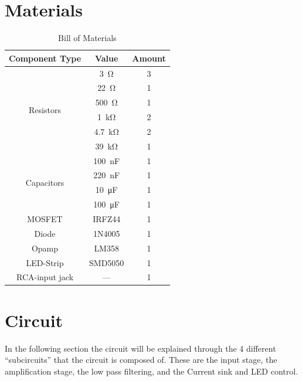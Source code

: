 \documentclass[a4paper]{article}
\begin{document}
  \section{Materials}

  \begin{table}[htpb]
  \centering
  \caption{Bill of Materials}
  \label{tab:BOM}
  \begin{tabular}{|c|c|c|}
  \hline
  \textbf{Component Type}     & \textbf{Value} & \textbf{Amount} \\ \hline
  \multirow{6}{*}{Resistors}  & \qty{3}{\ohm}   & 3 \\ \cline{2-3} 
                              & \qty{22}{\ohm}  & 1 \\ \cline{2-3} 
                              & \qty{500}{\ohm} & 1 \\ \cline{2-3} 
                              & \qty{1}{\kilo\ohm}   & 2 \\ \cline{2-3} 
                              & \qty{4,7}{\kilo\ohm} & 2 \\ \cline{2-3} 
                              & \qty{39}{\kilo\ohm}  & 1 \\ \hline
  \multirow{4}{*}{Capacitors} & \qty{100}{\nano\farad}  & 1 \\ \cline{2-3} 
                              & \qty{220}{\nano\farad}  & 1 \\ \cline{2-3} 
                              & \qty{10}{\micro\farad}  & 1 \\ \cline{2-3} 
                              & \qty{100}{\micro\farad} & 1 \\ \hline
  MOSFET                      & IRFZ44  & 1 \\ \hline
  Diode                       & 1N4005  & 1 \\ \hline
  Opamp                       & LM358   & 1 \\ \hline
  LED-Strip                   & SMD5050 & 1 \\ \hline
  RCA-input jack              & ---     & 1 \\ \hline
  \end{tabular}
  \end{table}

  \section{Circuit}
  In the following section the circuit will be explained through the 4 different ``subcircuits'' that the circuit is composed of. These are the input stage, the amplification stage, the low pass filtering, and the Current sink and LED control.
\end{document}
